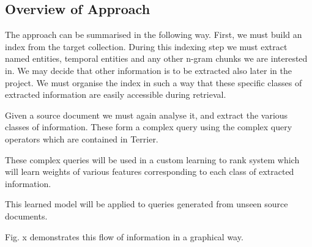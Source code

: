 \documentclass{mprop}
\begin{document}

\subsection{Overview of Approach}\label{proposed_approach.overview}
The approach can be summarised in the following way.
First, we must build an index from the target collection. 
During this indexing step we must extract named entities, temporal entities and any other n-gram chunks we are interested in. 
We may decide that other information is to be extracted also later in the project.
We must organise the index in such a way that these specific classes of extracted information are easily accessible during retrieval.

Given a source document we must again analyse it, and extract the various classes of information.
These form a complex query using the complex query operators which are contained in Terrier.

These complex queries will be used in a custom learning to rank system which will learn weights of various features corresponding to each class of extracted information.

This learned model will be applied to queries generated from unseen source documents.

Fig. x demonstrates this flow of information in a graphical way.
\end{document}
